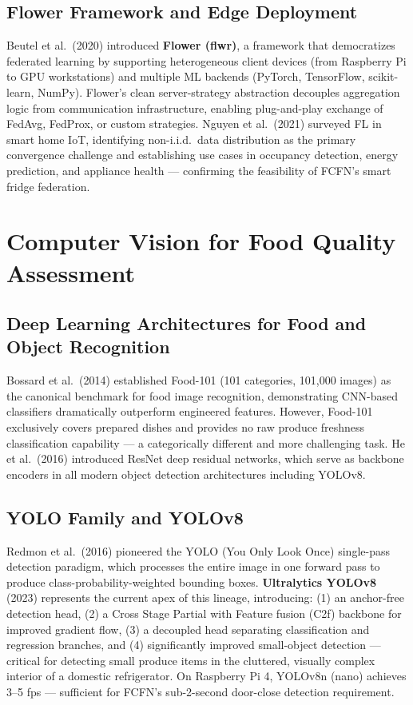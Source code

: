\documentclass[12pt,a4paper]{report}
\begin{document}
\subsection{Flower Framework and Edge Deployment}
Beutel et al.\ (2020) \cite{beutel2020} introduced \textbf{Flower (flwr)}, a framework that democratizes federated learning by supporting heterogeneous client devices (from Raspberry Pi to GPU workstations) and multiple ML backends (PyTorch, TensorFlow, scikit-learn, NumPy). Flower's clean server-strategy abstraction decouples aggregation logic from communication infrastructure, enabling plug-and-play exchange of FedAvg, FedProx, or custom strategies. Nguyen et al.\ (2021) \cite{nguyen2021} surveyed FL in smart home IoT, identifying non-i.i.d.\ data distribution as the primary convergence challenge and establishing use cases in occupancy detection, energy prediction, and appliance health — confirming the feasibility of FCFN's smart fridge federation.

\section{Computer Vision for Food Quality Assessment}

\subsection{Deep Learning Architectures for Food and Object Recognition}
Bossard et al.\ (2014) \cite{bossard2014} established Food-101 (101 categories, 101,000 images) as the canonical benchmark for food image recognition, demonstrating CNN-based classifiers dramatically outperform engineered features. However, Food-101 exclusively covers prepared dishes and provides no raw produce freshness classification capability — a categorically different and more challenging task. He et al.\ (2016) \cite{he2016resnet} introduced ResNet deep residual networks, which serve as backbone encoders in all modern object detection architectures including YOLOv8.

\subsection{YOLO Family and YOLOv8}
Redmon et al.\ (2016) \cite{redmon2016} pioneered the YOLO (You Only Look Once) single-pass detection paradigm, which processes the entire image in one forward pass to produce class-probability-weighted bounding boxes. \textbf{Ultralytics YOLOv8} (2023) \cite{ultralytics2023} represents the current apex of this lineage, introducing: (1) an anchor-free detection head, (2) a Cross Stage Partial with Feature fusion (C2f) backbone for improved gradient flow, (3) a decoupled head separating classification and regression branches, and (4) significantly improved small-object detection — critical for detecting small produce items in the cluttered, visually complex interior of a domestic refrigerator. On Raspberry Pi 4, YOLOv8n (nano) achieves 3--5 fps — sufficient for FCFN's sub-2-second door-close detection requirement.
\end{document}

